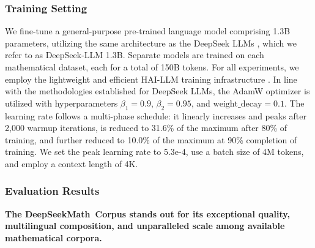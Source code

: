 \subsubsection{Training Setting}
\label{sec:quality-policy}
We fine-tune a general-purpose pre-trained language model comprising 1.3B parameters, utilizing the same architecture as the DeepSeek LLMs \citep{deepseek-llm}, which we refer to as DeepSeek-LLM 1.3B. Separate models are trained on each mathematical dataset, each for a total of 150B tokens. For all experiments, we employ the lightweight and efficient HAI-LLM training infrastructure \citep{haillm}. In line with the methodologies established for DeepSeek LLMs, the AdamW optimizer \citep{adamW} is utilized with hyperparameters $\beta_1=0.9$, $\beta_2=0.95$, and $\mathrm{weight\_decay}=0.1$. The learning rate follows a multi-phase schedule: it linearly increases and peaks after 2,000 warmup iterations, is reduced to 31.6\% of the maximum after 80\% of training, and further reduced to 10.0\% of the maximum at 90\% completion of training. We set the peak learning rate to 5.3e-4, use a batch size of 4M tokens, and employ a context length of 4K.

\subsubsection{Evaluation Results}

\textbf{The DeepSeekMath~Corpus stands out for its exceptional quality, multilingual composition, and unparalleled scale among available mathematical corpora.}

